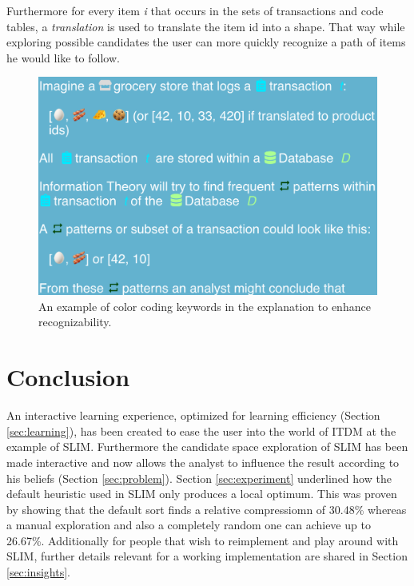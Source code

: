 \documentclass[runningheads]{llncs}
\begin{document}
Furthermore for every item \emph{i} that occurs in the sets of transactions and code tables, a \emph{translation} is used to translate the item id into a shape. That way while exploring possible candidates the user can more quickly recognize a path of items he would like to follow.


\begin{figure}[H]
\center
\includegraphics[width=1\linewidth]{img/color_coding.png}
\caption{An example of color coding keywords in the explanation to enhance recognizability.}
\label{fig:colors}
\end{figure}
\section{Conclusion}
An interactive learning experience, optimized for learning efficiency (Section \ref{sec:learning}), has been created to ease the user into the world of ITDM at the example of SLIM.
Furthermore the candidate space exploration of SLIM has been made interactive and now allows the analyst to influence the result according to his beliefs (Section \ref{sec:problem}). Section \ref{sec:experiment} underlined how the default heuristic used in SLIM only produces a local optimum. This was proven by showing that the default sort finds a relative compressiomn of 30.48\% whereas a manual exploration and also a completely random one can achieve up to 26.67\%.
Additionally for people that wish to reimplement and play around with SLIM, further details relevant for a working implementation are shared in Section \ref{sec:insights}.

%
%
%


%
\end{document}
